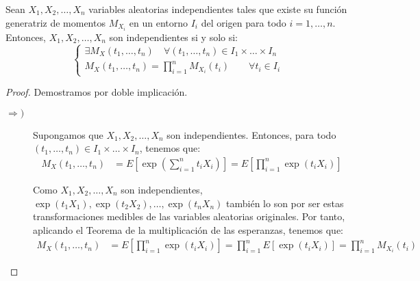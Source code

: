 \begin{coro}\label{coro:generatriz_momentos_independientes}
    Sean $X_1,X_2,\ldots,X_n$ variables aleatorias independientes tales que existe su función generatriz de momentos $M_{X_i}$ en un entorno $I_i$ del origen para todo $i=1,\dots,n$. Entonces, $X_1,X_2,\ldots,X_n$ son independientes si y solo si:
    \[
            \left\{
                \begin{array}{l}
                    \exists M_X(t_1, \ldots, t_n) \quad \forall (t_1, \ldots, t_n) \in I_1 \times \ldots \times I_n \\
                    M_X(t_1,\dots,t_n)=\prod\limits_{i=1}^n M_{X_i}(t_i)\qquad \forall t_i\in I_i
                \end{array}
            \right.
        \]

\end{coro}
\begin{proof}
    Demostramos por doble implicación.
    \begin{description}
        \item[$\Longrightarrow)$] Supongamos que $X_1,X_2,\ldots,X_n$ son independientes. Entonces, para todo $(t_1, \ldots, t_n) \in I_1 \times \ldots \times I_n$, tenemos que:
        \begin{align*}
            M_X(t_1, \ldots, t_n) &= E\left[\exp\left(\sum_{i=1}^n t_iX_i\right)\right]
            = E\left[\prod_{i=1}^n \exp(t_iX_i)\right]
        \end{align*}

        Como $X_1,X_2,\ldots,X_n$ son independientes, $\exp(t_1X_1),\exp(t_2X_2),\ldots,\exp(t_nX_n)$ también lo son por ser estas transformaciones medibles de las variables aleatorias originales. Por tanto, aplicando el Teorema de la multiplicación de las esperanzas, tenemos que:
        \begin{align*}
            M_X(t_1, \ldots, t_n) &= E\left[\prod_{i=1}^n \exp(t_iX_i)\right]
            = \prod_{i=1}^n E[\exp(t_iX_i)]
            = \prod_{i=1}^n M_{X_i}(t_i)
        \end{align*}

    \end{description}
\end{proof}



